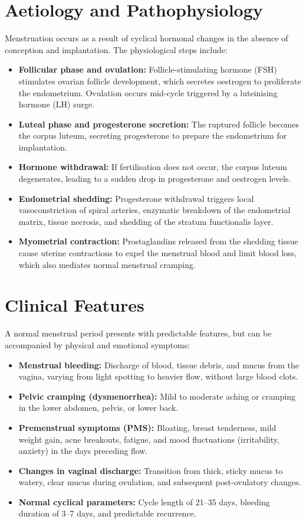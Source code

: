 \section*{Aetiology and Pathophysiology}
Menstruation occurs as a result of cyclical hormonal changes in the absence of conception and implantation. The physiological steps include:
\begin{itemize}
    \item \textbf{Follicular phase and ovulation:} Follicle-stimulating hormone (FSH) stimulates ovarian follicle development, which secretes oestrogen to proliferate the endometrium. Ovulation occurs mid-cycle triggered by a luteinising hormone (LH) surge.
    \item \textbf{Luteal phase and progesterone secretion:} The ruptured follicle becomes the corpus luteum, secreting progesterone to prepare the endometrium for implantation.
    \item \textbf{Hormone withdrawal:} If fertilisation does not occur, the corpus luteum degenerates, leading to a sudden drop in progesterone and oestrogen levels.
    \item \textbf{Endometrial shedding:} Progesterone withdrawal triggers local vasoconstriction of spiral arteries, enzymatic breakdown of the endometrial matrix, tissue necrosis, and shedding of the stratum functionalis layer.
    \item \textbf{Myometrial contraction:} Prostaglandins released from the shedding tissue cause uterine contractions to expel the menstrual blood and limit blood loss, which also mediates normal menstrual cramping.
\end{itemize}

\section*{Clinical Features}
A normal menstrual period presents with predictable features, but can be accompanied by physical and emotional symptoms:
\begin{itemize}
    \item \textbf{Menstrual bleeding:} Discharge of blood, tissue debris, and mucus from the vagina, varying from light spotting to heavier flow, without large blood clots.
    \item \textbf{Pelvic cramping (dysmenorrhea):} Mild to moderate aching or cramping in the lower abdomen, pelvis, or lower back.
    \item \textbf{Premenstrual symptoms (PMS):} Bloating, breast tenderness, mild weight gain, acne breakouts, fatigue, and mood fluctuations (irritability, anxiety) in the days preceding flow.
    \item \textbf{Changes in vaginal discharge:} Transition from thick, sticky mucus to watery, clear mucus during ovulation, and subsequent post-ovulatory changes.
    \item \textbf{Normal cyclical parameters:} Cycle length of 21--35 days, bleeding duration of 3--7 days, and predictable recurrence.
\end{itemize}

